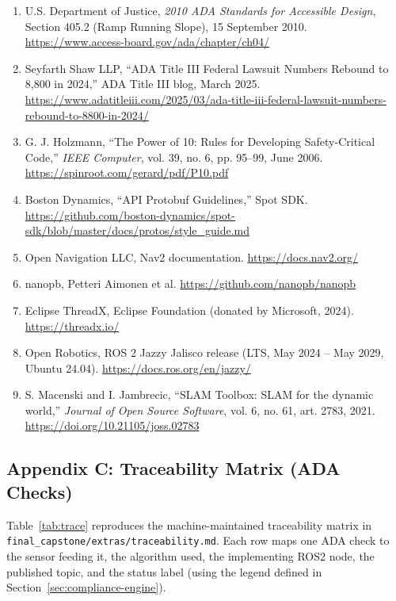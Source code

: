 \documentclass[11pt,letterpaper]{article}
\begin{document}
\begin{enumerate}[leftmargin=2em,itemsep=2pt]
\item U.S. Department of Justice, \textit{2010 ADA Standards for
      Accessible Design}, Section 405.2 (Ramp Running Slope), 15
      September 2010. \url{https://www.access-board.gov/ada/chapter/ch04/}
\item Seyfarth Shaw LLP, ``ADA Title III Federal Lawsuit Numbers
      Rebound to 8{,}800 in 2024,'' ADA Title III blog, March 2025.
      \url{https://www.adatitleiii.com/2025/03/ada-title-iii-federal-lawsuit-numbers-rebound-to-8800-in-2024/}
\item G. J. Holzmann, ``The Power of 10: Rules for Developing
      Safety-Critical Code,'' \textit{IEEE Computer}, vol. 39, no. 6,
      pp. 95--99, June 2006.
      \url{https://spinroot.com/gerard/pdf/P10.pdf}
\item Boston Dynamics, ``API Protobuf Guidelines,'' Spot SDK.
      \url{https://github.com/boston-dynamics/spot-sdk/blob/master/docs/protos/style_guide.md}
\item Open Navigation LLC, Nav2 documentation.
      \url{https://docs.nav2.org/}
\item nanopb, Petteri Aimonen et al.
      \url{https://github.com/nanopb/nanopb}
\item Eclipse ThreadX, Eclipse Foundation (donated by Microsoft, 2024).
      \url{https://threadx.io/}
\item Open Robotics, ROS 2 Jazzy Jalisco release (LTS, May 2024 --
      May 2029, Ubuntu 24.04). \url{https://docs.ros.org/en/jazzy/}
\item S. Macenski and I. Jambrecic, ``SLAM Toolbox: SLAM for the
      dynamic world,'' \textit{Journal of Open Source Software},
      vol. 6, no. 61, art. 2783, 2021.
      \url{https://doi.org/10.21105/joss.02783}
\end{enumerate}

\subsection*{Appendix C: Traceability Matrix (ADA Checks)}
\label{sec:traceability}

Table~\ref{tab:trace} reproduces the machine-maintained traceability
matrix in \texttt{final\_capstone/extras/traceability.md}. Each row
maps one ADA check to the sensor feeding it, the algorithm used, the
implementing ROS2 node, the published topic, and the status label
(using the legend defined in Section~\ref{sec:compliance-engine}).
\end{document}
